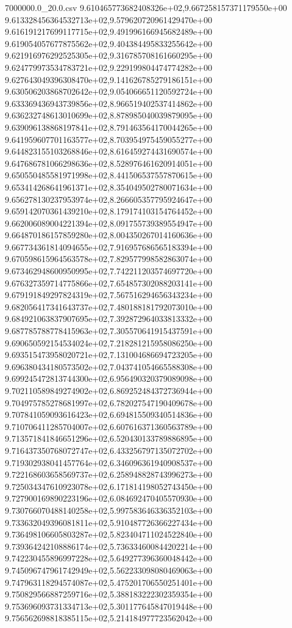 \begin{filecontents*}{7000000.0_20.0.csv}
9.610465773682408326e+02,9.667258157371179550e+00
9.613328456364532713e+02,9.579620720961429470e+00
9.616191217699117715e+02,9.491996166945682489e+00
9.619054057677875562e+02,9.404384495833255642e+00
9.621916976292525305e+02,9.316785708161660295e+00
9.624779973534783721e+02,9.229199804474774282e+00
9.627643049396308470e+02,9.141626785279186151e+00
9.630506203868702642e+02,9.054066651120592724e+00
9.633369436943739856e+02,8.966519402537414862e+00
9.636232748613010699e+02,8.878985040039879095e+00
9.639096138868197841e+02,8.791463564170044265e+00
9.641959607701163577e+02,8.703954975459055277e+00
9.644823155103268846e+02,8.616459274431690574e+00
9.647686781066298636e+02,8.528976461620914051e+00
9.650550485581971998e+02,8.441506537557870615e+00
9.653414268641961371e+02,8.354049502780071634e+00
9.656278130237953974e+02,8.266605357795924647e+00
9.659142070361439210e+02,8.179174103154764452e+00
9.662006089004221394e+02,8.091755739389554947e+00
9.664870186157859280e+02,8.004350267014160636e+00
9.667734361814094655e+02,7.916957686565183394e+00
9.670598615964563578e+02,7.829577998582863074e+00
9.673462948600950995e+02,7.742211203574697720e+00
9.676327359714775866e+02,7.654857302088203141e+00
9.679191849297824319e+02,7.567516294656343234e+00
9.682056417341643737e+02,7.480188181792073010e+00
9.684921063837907695e+02,7.392872964033813332e+00
9.687785788778415963e+02,7.305570641915437591e+00
9.690650592154534024e+02,7.218281215958086250e+00
9.693515473958020721e+02,7.131004686694723205e+00
9.696380434180573502e+02,7.043741054665588308e+00
9.699245472813744300e+02,6.956490320379089098e+00
9.702110589849274902e+02,6.869252484372736944e+00
9.704975785278681997e+02,6.782027547190409678e+00
9.707841059093616423e+02,6.694815509340514836e+00
9.710706411285704007e+02,6.607616371360563789e+00
9.713571841846651296e+02,6.520430133789886895e+00
9.716437350768072747e+02,6.433256797135072702e+00
9.719302938041457764e+02,6.346096361940908537e+00
9.722168603658569737e+02,6.258948828743996273e+00
9.725034347610923078e+02,6.171814198052743450e+00
9.727900169890223196e+02,6.084692470405570930e+00
9.730766070488140258e+02,5.997583646336352103e+00
9.733632049396081811e+02,5.910487726366227434e+00
9.736498106605803287e+02,5.823404711024522840e+00
9.739364242108886174e+02,5.736334600844202214e+00
9.742230455896997228e+02,5.649277396360048442e+00
9.745096747961742949e+02,5.562233098080469063e+00
9.747963118294574087e+02,5.475201706550251401e+00
9.750829566887259716e+02,5.388183222302359354e+00
9.753696093731334713e+02,5.301177645847019448e+00
9.756562698818385115e+02,5.214184977723562042e+00

\end{filecontents*}
